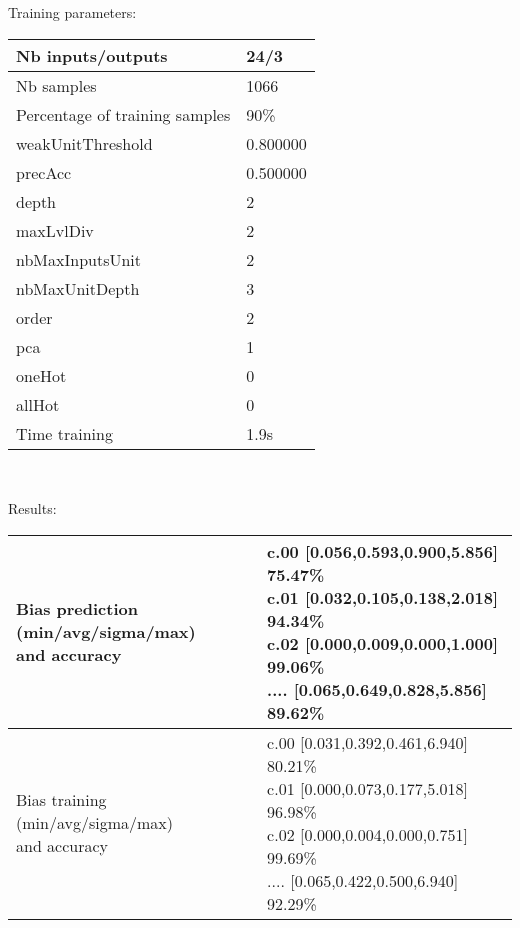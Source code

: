 Training parameters:\\
\begin{center}
\begin{tabular}{|l|l|}
\hline
Nb inputs/outputs&24/3\\
\hline
Nb samples&1066\\
\hline
Percentage of training samples&90\%\\
\hline
weakUnitThreshold&0.800000\\
\hline
precAcc&0.500000\\
\hline
depth&2\\
\hline
maxLvlDiv&2\\
\hline
nbMaxInputsUnit&2\\
\hline
nbMaxUnitDepth&3\\
\hline
order&2\\
\hline
pca&1\\
\hline
oneHot&0\\
\hline
allHot&0\\
\hline
Time training&1.9s\\
\hline
\end{tabular}\\
\end{center}\newline
Results:
\begin{center}
\begin{tabular}{|l|l|}
\hline
\makecell{Bias prediction (min/avg/sigma/max)\\and accuracy}&\makecell{c.00 [0.056,0.593,0.900,5.856] 75.47\%\\
c.01 [0.032,0.105,0.138,2.018] 94.34\%\\
c.02 [0.000,0.009,0.000,1.000] 99.06\%\\
.... [0.065,0.649,0.828,5.856] 89.62\%\\
}\\

\hline
\makecell{Bias training (min/avg/sigma/max)\\and accuracy}&\makecell{c.00 [0.031,0.392,0.461,6.940] 80.21\%\\
c.01 [0.000,0.073,0.177,5.018] 96.98\%\\
c.02 [0.000,0.004,0.000,0.751] 99.69\%\\
.... [0.065,0.422,0.500,6.940] 92.29\%\\
}\\
\hline
\end{tabular}\
\end{center}
